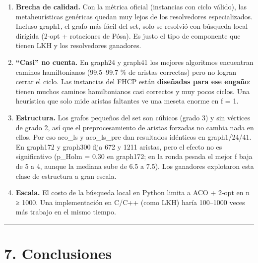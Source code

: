 \documentclass[
  spanish,
  11pt,
]{article}
\providecommand{\tightlist}{%
  \setlength{\itemsep}{0pt}\setlength{\parskip}{0pt}}
\begin{document}
\begin{enumerate}
\def\labelenumi{\arabic{enumi}.}
\tightlist
\item
  \textbf{Brecha de calidad.} Con la métrica oficial (instancias con
  ciclo válido), las metaheurísticas genéricas quedan muy lejos de los
  resolvedores especializados. Incluso graph1, el grafo más fácil del
  set, solo se resolvió con búsqueda local dirigida (2-opt + rotaciones
  de Pósa). Es justo el tipo de componente que tienen LKH y los
  resolvedores ganadores.
\item
  \textbf{``Casi'' no cuenta.} En graph24 y graph41 los mejores
  algoritmos encuentran caminos hamiltonianos (99.5--99.7 \% de aristas
  correctas) pero no logran cerrar el ciclo. Las instancias del FHCP
  están \textbf{diseñadas para ese engaño}: tienen muchos caminos
  hamiltonianos casi correctos y muy pocos ciclos. Una heurística que
  solo mide aristas faltantes ve una meseta enorme en f = 1.
\item
  \textbf{Estructura.} Los grafos pequeños del set son cúbicos (grado 3)
  y sin vértices de grado 2, así que el preprocesamiento de aristas
  forzadas no cambia nada en ellos. Por eso aco\_ls y aco\_ls\_pre dan
  resultados idénticos en graph1/24/41. En graph172 y graph300 fija 672
  y 1211 aristas, pero el efecto no es significativo (p\_Holm = 0.30 en
  graph172; en la ronda pesada el mejor f baja de 5 a 4, aunque la
  mediana sube de 6.5 a 7.5). Los ganadores explotaron esta clase de
  estructura a gran escala.
\item
  \textbf{Escala.} El costo de la búsqueda local en Python limita a ACO
  + 2-opt en n ≥ 1000. Una implementación en C/C++ (como LKH) haría
  100--1000 veces más trabajo en el mismo tiempo.
\end{enumerate}

\begin{center}\rule{0.5\linewidth}{0.5pt}\end{center}

\section{7. Conclusiones}\label{conclusiones}
\end{document}
